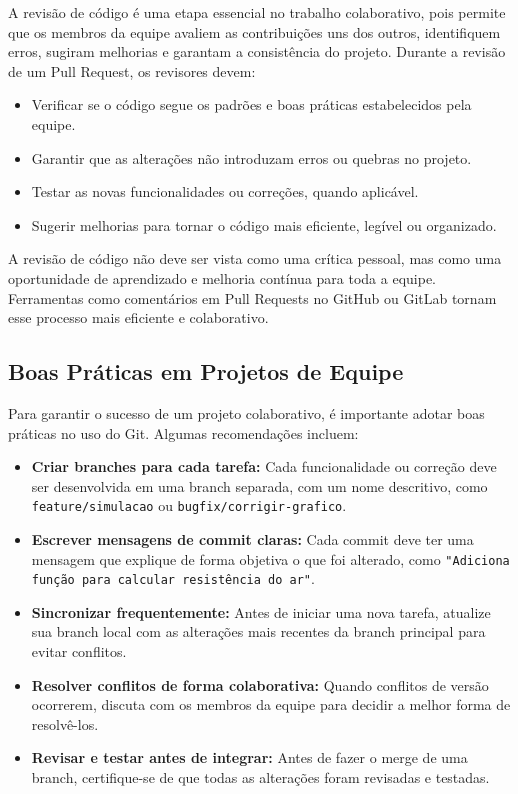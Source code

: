 A revisão de código é uma etapa essencial no trabalho colaborativo, pois permite que os membros da equipe avaliem as contribuições uns dos outros, identifiquem erros, sugiram melhorias e garantam a consistência do projeto. Durante a revisão de um Pull Request, os revisores devem:
\begin{itemize}
    \item Verificar se o código segue os padrões e boas práticas estabelecidos pela equipe.
    \item Garantir que as alterações não introduzam erros ou quebras no projeto.
    \item Testar as novas funcionalidades ou correções, quando aplicável.
    \item Sugerir melhorias para tornar o código mais eficiente, legível ou organizado.
\end{itemize}

A revisão de código não deve ser vista como uma crítica pessoal, mas como uma oportunidade de aprendizado e melhoria contínua para toda a equipe. Ferramentas como comentários em Pull Requests no GitHub ou GitLab tornam esse processo mais eficiente e colaborativo.

\subsection{Boas Práticas em Projetos de Equipe}

Para garantir o sucesso de um projeto colaborativo, é importante adotar boas práticas no uso do Git. Algumas recomendações incluem:
\begin{itemize}
    \item \textbf{Criar branches para cada tarefa:} Cada funcionalidade ou correção deve ser desenvolvida em uma branch separada, com um nome descritivo, como \texttt{feature/simulacao} ou \texttt{bugfix/corrigir-grafico}.
    \item \textbf{Escrever mensagens de commit claras:} Cada commit deve ter uma mensagem que explique de forma objetiva o que foi alterado, como \texttt{"Adiciona função para calcular resistência do ar"}.
    \item \textbf{Sincronizar frequentemente:} Antes de iniciar uma nova tarefa, atualize sua branch local com as alterações mais recentes da branch principal para evitar conflitos.
    \item \textbf{Resolver conflitos de forma colaborativa:} Quando conflitos de versão ocorrerem, discuta com os membros da equipe para decidir a melhor forma de resolvê-los.
    \item \textbf{Revisar e testar antes de integrar:} Antes de fazer o merge de uma branch, certifique-se de que todas as alterações foram revisadas e testadas.
\end{itemize}

